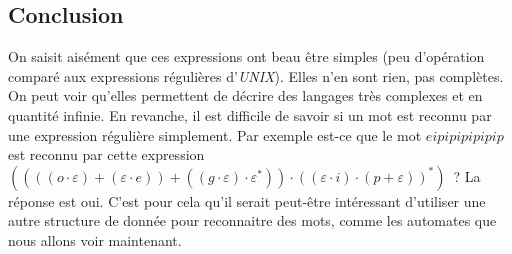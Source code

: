\vphantom{}

\subsection{Conclusion}

On saisit aisément que ces expressions ont beau être simples (peu d’opération
comparé aux expressions régulières d’\textit{UNIX}). Elles n’en sont rien, pas
complètes. On peut voir qu’elles permettent de décrire des langages très
complexes et en quantité infinie. En revanche, il est difficile de savoir si un
mot est reconnu par une expression régulière simplement. Par exemple est-ce que
le mot \(eipipipipipip\) est reconnu par cette expression \(((((o \cdot
\varepsilon)+(\varepsilon \cdot e))+((g\cdot \varepsilon) \cdot \varepsilon^*))
\cdot ((\varepsilon \cdot i)\cdot (p+\varepsilon))^*)\)~? La réponse est oui.
C’est pour cela qu’il serait peut-être intéressant d’utiliser une autre
structure de donnée pour reconnaitre des mots, comme les automates que nous
allons voir maintenant.
